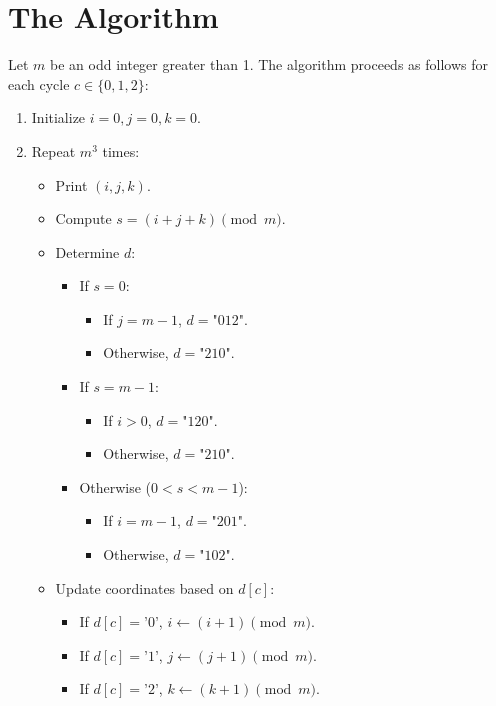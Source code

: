 \documentclass[12pt]{article}
\begin{document}
\section{The Algorithm}
Let $m$ be an odd integer greater than 1. The algorithm proceeds as follows for each cycle $c \in \{0, 1, 2\}$:
\begin{enumerate}
    \item Initialize $i=0, j=0, k=0$.
    \item Repeat $m^3$ times:
    \begin{itemize}
        \item Print $(i, j, k)$.
        \item Compute $s = (i + j + k) \pmod m$.
        \item Determine $d$:
        \begin{itemize}
            \item If $s = 0$:
            \begin{itemize}
                \item If $j = m-1$, $d = \text{"012"}$.
                \item Otherwise, $d = \text{"210"}$.
            \end{itemize}
            \item If $s = m-1$:
            \begin{itemize}
                \item If $i > 0$, $d = \text{"120"}$.
                \item Otherwise, $d = \text{"210"}$.
            \end{itemize}
            \item Otherwise ($0 < s < m-1$):
            \begin{itemize}
                \item If $i = m-1$, $d = \text{"201"}$.
                \item Otherwise, $d = \text{"102"}$.
            \end{itemize}
        \end{itemize}
        \item Update coordinates based on $d[c]$:
        \begin{itemize}
            \item If $d[c] = \text{'0'}$, $i \leftarrow (i+1) \pmod m$.
            \item If $d[c] = \text{'1'}$, $j \leftarrow (j+1) \pmod m$.
            \item If $d[c] = \text{'2'}$, $k \leftarrow (k+1) \pmod m$.
        \end{itemize}
    \end{itemize}
\end{enumerate}
\end{document}
